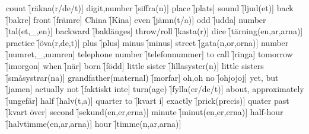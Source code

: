 \begin{questions}
    \begin{multicols}{2}
        \raggedcolumns
        \question count \f[räkna(r/de/t)]
        \question digit,number \f[siffra(n)]
        \question place \f[plats]
        \question sound \f[ljud(et)]
        \question back \f[bakre]
        \question front \f[främre]
        \question China \f[Kina]
        \question even \f[jämn(t/a)]
        \question odd  \f[udda]
        \question number \f[tal(et,\_,en)]
        \question backward \f[baklänges]
        \question throw/roll \f[kasta(r)]
        \question dice \f[tärning(en,ar,arna)]
        \question practice \f[öva(r,de,t)]
        \question plus \f[plus]
        \question minus \f[minus]
        \question street \f[gata(n,or,orna)]
        \question number \f[numret,\_,numren]
        \question telephone number \f[telefonnummer]
        \question to call \f[ringa]
        \question tomorrow \f[imorgon]
        \question when \f[när]
        \question born \f[född]
        \question little sister \f[lillasyster(n)]
        \question little sisters \f[småsystrar(na)]
        \question grandfather(maternal) \f[morfar]
        \question oh,oh no \f[ohjojoj]
        \question yet, but \f[jamen]
        \question actually not \f[faktiskt inte]
        \question turn(age) \f[fylla(er/de/t)]
        \question about, approximately \f[ungefär]
        \question half \f[halv(t,a)]
        \question quarter to \f[kvart i]
        \question exactly \f[prick(precis)]
        \question quater past \f[kvart över]
        \question second \f[sekund(en,er,erna)]
        \question minute \f[minut(en,er,erna)]
        \question half-hour \f[halvtimme(en,ar,arna)]
        \question hour \f[timme(n,ar,arna)]
    \end{multicols}
\end{questions}
